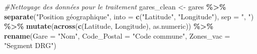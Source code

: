\documentclass[
]{article}
\newenvironment{Shaded}{\begin{snugshade}}{\end{snugshade}}
\newcommand{\AttributeTok}[1]{\textcolor[rgb]{0.13,0.29,0.53}{#1}}
\newcommand{\CommentTok}[1]{\textcolor[rgb]{0.56,0.35,0.01}{\textit{#1}}}
\newcommand{\FunctionTok}[1]{\textcolor[rgb]{0.13,0.29,0.53}{\textbf{#1}}}
\newcommand{\NormalTok}[1]{#1}
\newcommand{\OtherTok}[1]{\textcolor[rgb]{0.56,0.35,0.01}{#1}}
\newcommand{\SpecialCharTok}[1]{\textcolor[rgb]{0.81,0.36,0.00}{\textbf{#1}}}
\newcommand{\StringTok}[1]{\textcolor[rgb]{0.31,0.60,0.02}{#1}}
\begin{document}
\begin{Shaded}
\begin{Highlighting}[]
\CommentTok{\#Nettoyage des données pour le traitement}
\NormalTok{gares\_clean }\OtherTok{\textless{}{-}}\NormalTok{ gares }\SpecialCharTok{\%\textgreater{}\%}
  \FunctionTok{separate}\NormalTok{(}\StringTok{"Position géographique"}\NormalTok{, }\AttributeTok{into =} \FunctionTok{c}\NormalTok{(}\StringTok{"Latitude"}\NormalTok{, }\StringTok{"Longitude"}\NormalTok{), }\AttributeTok{sep =} \StringTok{", "}\NormalTok{) }\SpecialCharTok{\%\textgreater{}\%}
  \FunctionTok{mutate}\NormalTok{(}\FunctionTok{across}\NormalTok{(}\FunctionTok{c}\NormalTok{(Latitude, Longitude), as.numeric)) }\SpecialCharTok{\%\textgreater{}\%}
  \FunctionTok{rename}\NormalTok{(}\AttributeTok{Gare =} \StringTok{"Nom"}\NormalTok{, }\AttributeTok{Code\_Postal =} \StringTok{"Code commune"}\NormalTok{, }\AttributeTok{Zones\_vac =} \StringTok{"Segment DRG"}\NormalTok{)}


\end{Highlighting}
\end{Shaded}
\end{document}
